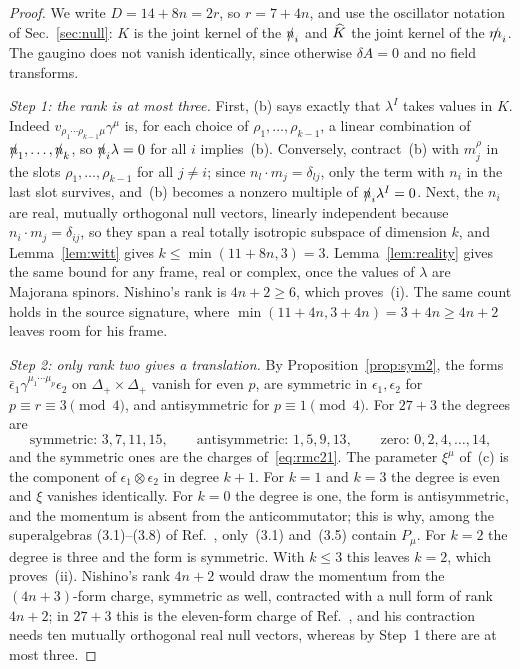 \begin{proof}
We write $D=14+8n=2r$, so $r=7+4n$, and use the oscillator notation of Sec.~\ref{sec:null}: $K$ is the joint kernel of the $\slashed{n}_i$ and $\widehat{K}$ the joint kernel of the $\slashed{m}_i$. The gaugino does not vanish identically, since otherwise $\delta A=0$ and no field transforms.

\emph{Step 1: the rank is at most three.} First, (b) says exactly that $\lambda^I$ takes values in $K$. Indeed $v_{\rho_1\cdots\rho_{k-1}\mu}\gamma^\mu$ is, for each choice of $\rho_1,\dots,\rho_{k-1}$, a linear combination of $\slashed{n}_1,\dots,\slashed{n}_k$, so $\slashed{n}_i\lambda=0$ for all $i$ implies~(b). Conversely, contract~(b) with $m_j^{\rho}$ in the slots $\rho_1,\dots,\rho_{k-1}$ for all $j\ne i$; since $n_l\cdot m_j=\delta_{lj}$, only the term with $n_i$ in the last slot survives, and~(b) becomes a nonzero multiple of $\slashed{n}_i\lambda^I=0$. Next, the $n_i$ are real, mutually orthogonal null vectors, linearly independent because $n_i\cdot m_j=\delta_{ij}$, so they span a real totally isotropic subspace of dimension $k$, and Lemma~\ref{lem:witt} gives $k\le\min(11+8n,3)=3$. Lemma~\ref{lem:reality} gives the same bound for any frame, real or complex, once the values of $\lambda$ are Majorana spinors. Nishino's rank is $4n+2\ge6$, which proves~(i). The same count holds in the source signature, where $\min(11+4n,3+4n)=3+4n\ge4n+2$ leaves room for his frame.

\emph{Step 2: only rank two gives a translation.} By Proposition~\ref{prop:sym2}, the forms $\bar\epsilon_1\gamma^{\mu_1\cdots\mu_p}\epsilon_2$ on $\Delta_+\times\Delta_+$ vanish for even $p$, are symmetric in $\epsilon_1,\epsilon_2$ for $p\equiv r\equiv3\pmod4$, and antisymmetric for $p\equiv1\pmod4$. For $27+3$ the degrees are
\[
\text{symmetric: }3,7,11,15,\qquad\text{antisymmetric: }1,5,9,13,\qquad\text{zero: }0,2,4,\dots,14,
\]
and the symmetric ones are the charges of~\eqref{eq:rmc21}. The parameter $\xi^\mu$ of~(c) is the component of $\epsilon_1\otimes\epsilon_2$ in degree $k+1$. For $k=1$ and $k=3$ the degree is even and $\xi$ vanishes identically. For $k=0$ the degree is one, the form is antisymmetric, and the momentum is absent from the anticommutator; this is why, among the superalgebras (3.1)--(3.8) of Ref.~\cite{RiosMarraniChester2019}, only~(3.1) and~(3.5) contain $P_\mu$. For $k=2$ the degree is three and the form is symmetric. With $k\le3$ this leaves $k=2$, which proves~(ii). Nishino's rank $4n+2$ would draw the momentum from the $(4n+3)$-form charge, symmetric as well, contracted with a null form of rank $4n+2$; in $27+3$ this is the eleven-form charge of Ref.~\cite{RiosMarraniChester2020}, and his contraction needs ten mutually orthogonal real null vectors, whereas by Step~1 there are at most three.


\end{proof}

